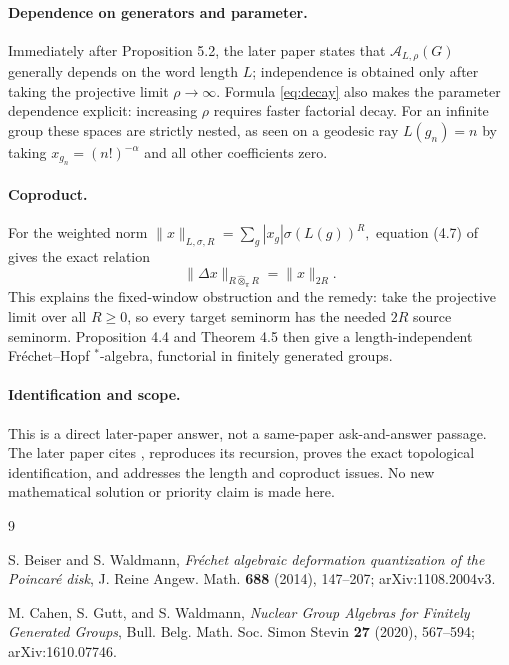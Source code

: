\documentclass[10pt]{article}
\newcommand{\A}{\mathcal A}
\begin{document}
\paragraph{Dependence on generators and parameter.}
Immediately after Proposition 5.2, the later paper states that
$\A_{L,\rho}(G)$ generally depends on the word length $L$; independence is
obtained only after taking the projective limit $\rho\to\infty$.  Formula
\eqref{eq:decay} also makes the parameter dependence explicit: increasing
$\rho$ requires faster factorial decay.  For an infinite group these
spaces are strictly nested, as seen on a geodesic ray $L(g_n)=n$ by taking
$x_{g_n}=(n!)^{-\alpha}$ and all other coefficients zero.

\newpage
\paragraph{Coproduct.}
For the weighted norm
\(
 \|x\|_{L,\sigma,R}=\sum_g|x_g|\sigma(L(g))^R,
\)
equation (4.7) of \cite{CGW} gives the exact relation
\[
 \|\Delta x\|_{R\widehat\otimes_\pi R}=\|x\|_{2R}.
 \tag{4}\label{eq:coproduct}
\]
This explains the fixed-window obstruction and the remedy: take the
projective limit over all $R\geq0$, so every target seminorm has the needed
$2R$ source seminorm.  Proposition 4.4 and Theorem 4.5 then give a
length-independent Fr\'echet--Hopf $^*$-algebra, functorial in finitely
generated groups.

\paragraph{Identification and scope.}
This is a direct later-paper answer, not a same-paper ask-and-answer passage.
The later paper cites \cite{BW}, reproduces its recursion, proves the exact
topological identification, and addresses the length and coproduct issues.
No new mathematical solution or priority claim is made here.

\begin{thebibliography}{9}
\small
\raggedright

S. Beiser and S. Waldmann,
\emph{Fr\'echet algebraic deformation quantization of the Poincar\'e disk},
J. Reine Angew. Math. \textbf{688} (2014), 147--207;
arXiv:1108.2004v3.

M. Cahen, S. Gutt, and S. Waldmann,
\emph{Nuclear Group Algebras for Finitely Generated Groups},
Bull. Belg. Math. Soc. Simon Stevin \textbf{27} (2020), 567--594;
arXiv:1610.07746.

\end{thebibliography}
\end{document}

